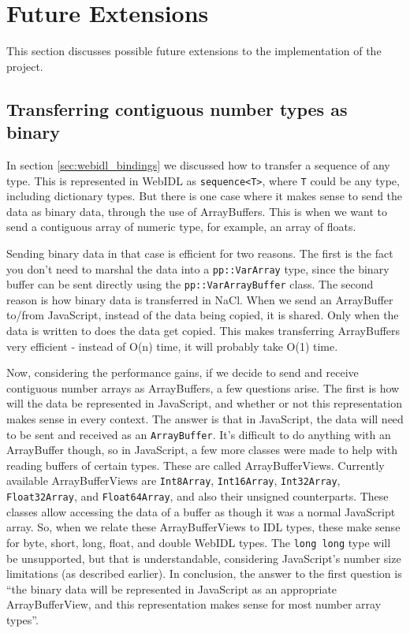 \section{Future Extensions} %
\label{sec:future_extensions}
This section discusses possible future extensions to the implementation of the project.


\subsection{Transferring contiguous number types as binary} %
\label{sub:transferring_binary}
In section \ref{sec:webidl_bindings} we discussed how to transfer a sequence of any type. This is represented in WebIDL as \lstinline{sequence<T>}, where \lstinline{T} could be any type, including dictionary types. But there is one case where it makes sense to send the data as binary data, through the use of ArrayBuffers. This is when we want to send a contiguous array of numeric type, for example, an array of floats. 

Sending binary data in that case is efficient for two reasons. The first is the fact you don't need to marshal the data into a \lstinline{pp::VarArray} type, since the binary buffer can be sent directly using the \lstinline{pp::VarArrayBuffer} class. The second reason is how binary data is transferred in NaCl. When we send an ArrayBuffer to/from JavaScript, instead of the data being copied, it is shared. Only when the data is written to does the data get copied. This makes transferring ArrayBuffers very efficient - instead of O(n) time, it will probably take O(1) time.

Now, considering the performance gains, if we decide to send and receive contiguous number arrays as ArrayBuffers, a few questions arise. The first is how will the data be represented in JavaScript, and whether or not this representation makes sense in every context. The answer is that in JavaScript, the data will need to be sent and received as an \lstinline{ArrayBuffer}. It's difficult to do anything with an ArrayBuffer though, so in JavaScript, a few more classes were made to help with reading buffers of certain types. These are called ArrayBufferViews. Currently available ArrayBufferViews are \lstinline{Int8Array}, \lstinline{Int16Array}, \lstinline{Int32Array}, \lstinline{Float32Array}, and \lstinline{Float64Array}, and also their unsigned counterparts. These classes allow accessing the data of a buffer as though it was a normal JavaScript array. So, when we relate these ArrayBufferViews to IDL types, these make sense for byte, short, long, float, and double WebIDL types. The \lstinline{long long} type will be unsupported, but that is understandable, considering JavaScript's number size limitations (as described earlier). In conclusion, the answer to the first question is ``the binary data will be represented in JavaScript as an appropriate ArrayBufferView, and this representation makes sense for most number array types''.

